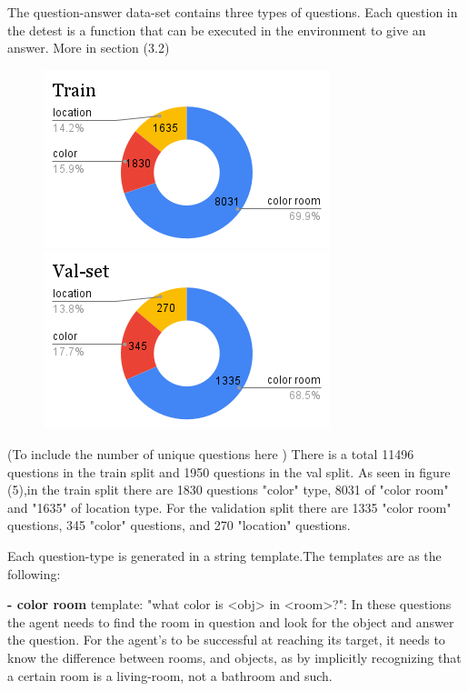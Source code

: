 The question-answer data-set contains three types of questions.
Each question in the detest is a function that can be executed in the environment to give an answer. More in section (3.2)
\begin{figure}[H]

\includegraphics[scale=0.45]{images/Train.png}
\includegraphics[scale=0.45]{images/Val-set.png}
\end{figure}



(To include the number of unique questions here )
There is a total 11496 questions in the train split and 1950 questions in the val split. As seen in figure (5),in the train split there are 1830 questions "color" type, 8031 of "color room"  and "1635" of location type. For the validation split there are 1335 "color room" questions, 345 "color" questions, and 270 "location" questions. 



Each question-type is generated in a string template.The templates are as the following:

\textbf{- color room} template: "what color is <obj> in  <room>?": In these questions the agent needs to find the room in question and look for the object and answer the question. For the agent's to be successful at reaching its target, it needs to know the difference between rooms, and objects, as by implicitly recognizing that a certain room is a living-room, not a bathroom and such.  

